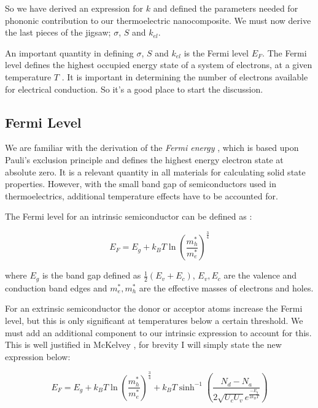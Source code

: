 \documentclass[12pt]{article}
\begin{document}
So we have derived an expression for $k$ and defined the parameters needed for phononic contribution to our thermoelectric nanocomposite. We must now derive the last pieces of the jigsaw; $\sigma$, $S$ and $k_{el}$.

An important quantity in defining $\sigma$, $S$ and $k_{el}$ is the Fermi level $E_F$. The Fermi level defines the highest occupied energy state of a system of electrons, at a given temperature $T$ \cite{kittel}. It is important in determining the number of electrons available for electrical conduction. So it's a good place to start the discussion.

\subsection{Fermi Level}
We are familiar with the derivation of the \emph{Fermi energy} \cite{kittel}, which is based upon Pauli's exclusion principle and defines the highest energy electron state at absolute zero. It is a relevant quantity in all materials for calculating solid state properties. However, with the small band gap of semiconductors used in thermoelectrics, additional temperature effects have to be accounted for.

The Fermi level for an intrinsic semiconductor can be defined as \cite{mckelvey}:

\begin{equation}
\label{eq:intrinsic-fermi}
	E_F = E_g + k_B T\ln\left(\frac{m^*_h}{m^*_e}\right)^\frac{3}{4}
\end{equation}

where $E_g$ is the band gap defined as $\frac{1}{2} (E_v + E_c)$, $E_v, E_c$ are the valence and conduction band edges and $m^*_e, m^*_h$ are the effective masses of electrons and holes.

For an extrinsic semiconductor the donor or acceptor atoms increase the Fermi level, but this is only significant at temperatures below a certain threshold. We must add an additional component to our intrinsic expression to account for this. This is well justified in McKelvey \cite{mckelvey}, for brevity I will simply state the new expression below:

\begin{equation}
\label{eq:extrinsic-fermi}
	E_F = E_g + k_B T\ln\left(\frac{m^*_h}{m^*_e}\right)^\frac{3}{4} + k_BT\sinh^{-1} \left(\frac{N_d-N_a}{2\sqrt{U_cU_v}e^{\frac{-E_g}{2k_BT}}}\right)
\end{equation}
\end{document}
